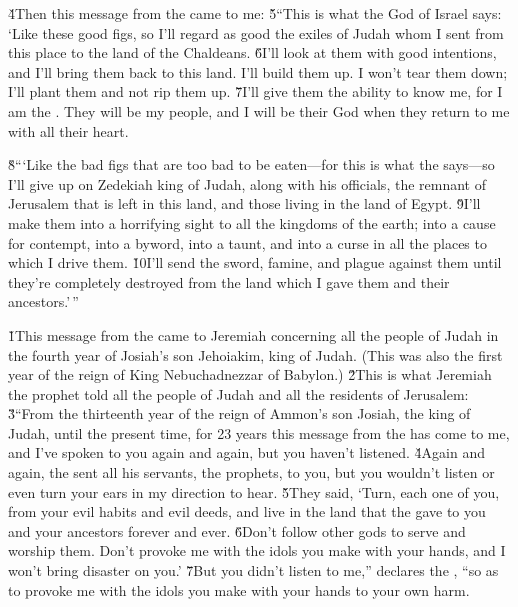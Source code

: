 \v{4}Then this message from the  came to me: \v{5}``This is what the  God of Israel says: `Like these good figs, so I'll regard as good the exiles of Judah whom I sent from this place to the land of the Chaldeans. \v{6}I'll look at them with good intentions, and I'll bring them back to this land. I'll build them up. I won't tear them down; I'll plant them and not rip them up. \v{7}I'll give them the ability to know me, for I am the . They will be my people, and I will be their God when they return to me with all their heart.

\v{8}```Like the bad figs that are too bad to be eaten---for this is what the  says---so I'll give up on Zedekiah king of Judah, along with his officials, the remnant of Jerusalem that is left in this land, and those living in the land of Egypt. \v{9}I'll make them into a horrifying sight to all the kingdoms of the earth; into a cause for contempt, into a byword, into a taunt, and into a curse in all the places to which I drive them. \v{10}I'll send the sword, famine, and plague against them until they're completely destroyed from the land which I gave them and their ancestors.'\,''

\v{1}This message from the  came to Jeremiah concerning all the people of Judah in the fourth year of Josiah's son Jehoiakim, king of Judah. (This was also the first year of the reign of King Nebuchadnezzar of Babylon.) \v{2}This is what Jeremiah the prophet told all the people of Judah and all the residents of Jerusalem: \v{3}``From the thirteenth year of the reign of Ammon's son Josiah, the king of Judah, until the present time, for 23 years this message from the  has come to me, and I've spoken to you again and again, but you haven't listened. \v{4}Again and again, the  sent all his servants, the prophets, to you, but you wouldn't listen or even turn your ears in my direction to hear. \v{5}They said, `Turn, each one of you, from your evil habits and evil deeds, and live in the land that the  gave to you and your ancestors forever and ever. \v{6}Don't follow other gods to serve and worship them. Don't provoke me with the idols you make with your hands, and I won't bring disaster on you.' \v{7}But you didn't listen to me,'' declares the , ``so as to provoke me with the idols you make with your hands to your own harm.

